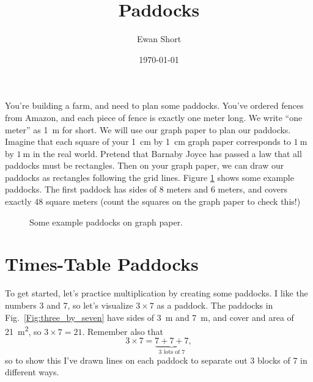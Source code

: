 \documentclass{article}
\title{Paddocks}
\author{Ewan Short}
\date{\today}
\begin{document}
\maketitle

\noindent You're building a farm, and need to plan some paddocks. You've ordered fences from Amazon, and each piece of fence is exactly one meter long. We write ``one meter'' as \SI{1}{\meter} for short. We will use our graph paper to plan our paddocks. Imagine that each square of your \SI{1}{\centi\meter} by \SI{1}{\centi\meter} graph paper corresponds to $\SI{1}{\meter}$ by $\SI{1}{\meter}$ in the real world. Pretend that Barnaby Joyce has passed a law that all paddocks must be rectangles. Then on your graph paper, we can draw our paddocks as rectangles following the grid lines. Figure \ref{Fig:example_paddocks} shows some example paddocks. The first paddock has sides of 8 meters and 6 meters, and covers exactly 48 square meters (count the squares on the graph paper to check this!) 

\newcommand{\paddock}[4]{
    \draw[blue, thick] (#1,#2) rectangle (#1+#3,#2+#4);
    \pgfmathparse{int(#3)}
    \let\widthlabel\pgfmathresult
    \pgfmathparse{int(#4)}
    \let\heightlabel\pgfmathresult
    \pgfmathparse{int(\heightlabel*\widthlabel)}
    \let\arealabel\pgfmathresult
    \node[below=2pt] at (#1+#3/2,#2) {\widthlabel\ m};
    \node[left=2pt] at (#1,#2+#4/2) {\heightlabel\ m};
    \node at (#1+#3/2,#2+#4/2) {\arealabel\ m$^2$};
}

\begin{figure}[ht]
    \centering
    \caption{Some example paddocks on graph paper.}
    \label{Fig:example_paddocks}
\end{figure}

\section{Times-Table Paddocks}
\noindent To get started, let's practice multiplication by creating some paddocks. I like the numbers 3 and 7, so let's visualize $3\times 7$ as a paddock. The paddocks in Fig.~\ref{Fig:three_by_seven} have sides of \SI{3}{\meter} and \SI{7}{\meter}, and cover and area of \SI{21}{\meter\squared}, so $3\times 7 = 21$. Remember also that
$$3\times 7 = \underbrace{7 + 7 + 7}_{\text{3 lots of 7}},$$ 
so to show this I've drawn lines on each paddock to separate out 3 blocks of 7 in different ways.
\end{document}
